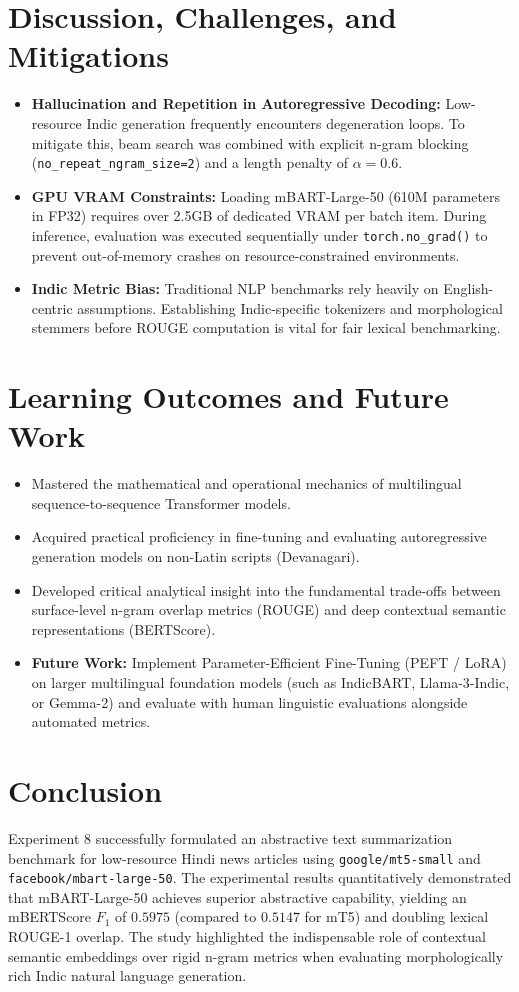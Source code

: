 \section{Discussion, Challenges, and Mitigations}
\begin{itemize}
    \item \textbf{Hallucination and Repetition in Autoregressive Decoding:} Low-resource Indic generation frequently encounters degeneration loops. To mitigate this, beam search was combined with explicit n-gram blocking (\lstinline|no_repeat_ngram_size=2|) and a length penalty of $\alpha = 0.6$.
    \item \textbf{GPU VRAM Constraints:} Loading mBART-Large-50 (610M parameters in FP32) requires over 2.5GB of dedicated VRAM per batch item. During inference, evaluation was executed sequentially under \lstinline|torch.no_grad()| to prevent out-of-memory crashes on resource-constrained environments.
    \item \textbf{Indic Metric Bias:} Traditional NLP benchmarks rely heavily on English-centric assumptions. Establishing Indic-specific tokenizers and morphological stemmers before ROUGE computation is vital for fair lexical benchmarking.
\end{itemize}

\section{Learning Outcomes and Future Work}
\begin{itemize}
    \item Mastered the mathematical and operational mechanics of multilingual sequence-to-sequence Transformer models.
    \item Acquired practical proficiency in fine-tuning and evaluating autoregressive generation models on non-Latin scripts (Devanagari).
    \item Developed critical analytical insight into the fundamental trade-offs between surface-level n-gram overlap metrics (ROUGE) and deep contextual semantic representations (BERTScore).
    \item \textbf{Future Work:} Implement Parameter-Efficient Fine-Tuning (PEFT / LoRA) on larger multilingual foundation models (such as IndicBART, Llama-3-Indic, or Gemma-2) and evaluate with human linguistic evaluations alongside automated metrics.
\end{itemize}

\section{Conclusion}
Experiment 8 successfully formulated an abstractive text summarization benchmark for low-resource Hindi news articles using \texttt{google/mt5-small} and \texttt{facebook/mbart-large-50}. The experimental results quantitatively demonstrated that mBART-Large-50 achieves superior abstractive capability, yielding an mBERTScore $F_1$ of $0.5975$ (compared to $0.5147$ for mT5) and doubling lexical ROUGE-1 overlap. The study highlighted the indispensable role of contextual semantic embeddings over rigid n-gram metrics when evaluating morphologically rich Indic natural language generation.
